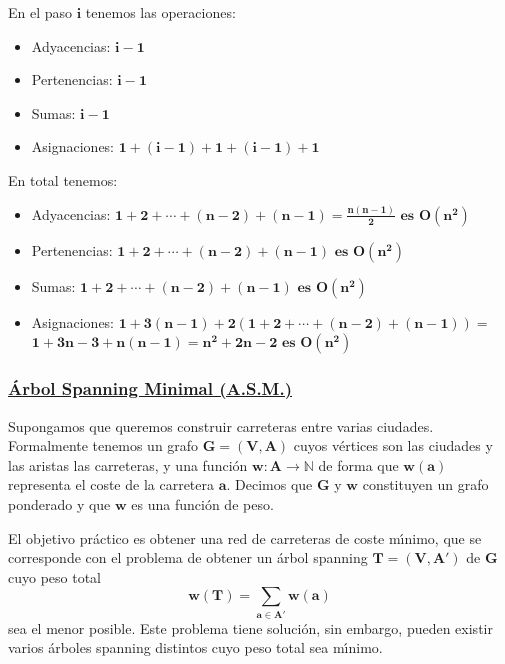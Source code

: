 \documentclass[twoside]{report}
\newcommand{\bs}[1]{\boldsymbol{#1}}
\begin{document}
        \noindent En el paso $\bs{i}$ tenemos las operaciones:
        \begin{itemize}
        \item Adyacencias: $\bs{i-1}$
        \item Pertenencias: $\bs{i-1}$
        \item Sumas: $\bs{i-1}$
        \item Asignaciones: $\bs{1+(i-1)+1+(i-1)+1}$
        \end{itemize}
\vspace{0.3cm}
        \noindent En total tenemos:
        \begin{itemize}
        \item Adyacencias:
        $\bs{1+2+\cdots+(n-2)+(n-1)=\frac{n(n-1)}{2} \mbox{  es  } O(n^2)}$
        \item Pertenencias: $\bs{1+2+\cdots+(n-2)+(n-1)\mbox{  es  }O(n^2)}$
        \item Sumas: $\bs{1+2+\cdots+(n-2)+(n-1) \mbox{  es  }O(n^2)}$
        \item Asignaciones: $\bs{1+3(n-1)+2\left(1+2+\cdots+(n-2)+(n-1)\right)=}$\\
        $\bs{1+3n-3+n(n-1)=n^2+2n-2 \mbox{  es  }O(n^2)}$
        \end{itemize}

\vspace{0.4cm}
\subsubsection{\underline{\'{A}rbol Spanning Minimal (A.S.M.)}}

Supongamos que queremos construir carreteras entre varias ciudades. Formalmente tenemos un grafo $\bs{G=(V,A)}$ cuyos v\'{e}rtices son las ciudades y las aristas las carreteras, y una funci\'{o}n $\bs{w:A\rightarrow\mathbb{N}}$ de forma que $\bs{w(a)}$ representa el coste de la carretera $\bs{a}$. Decimos que $\bs{G}$ y $\bs{w}$ constituyen un grafo ponderado y que $\bs{w}$ es una funci\'{o}n de peso.
\vspace{0.2cm}

El objetivo pr\'{a}ctico es obtener una red de carreteras de coste m\'{\i}nimo, que se corresponde con el problema de obtener un \'{a}rbol spanning $\bs{T=(V,A')}$ de $\bs{G}$ cuyo peso total $$\bs{w(T)=\sum_{a\in A'}w(a)}$$ sea el menor posible. Este problema tiene soluci\'{o}n, sin embargo, pueden existir varios \'{a}rboles spanning distintos cuyo peso total sea m\'{\i}nimo.
\vspace{0.6cm}
\end{document}
